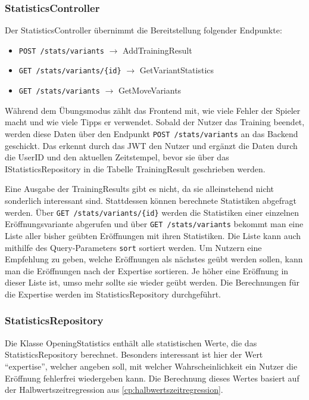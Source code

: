 \subsubsection{StatisticsController}
Der StatisticsController übernimmt die Bereitstellung folgender Endpunkte:

\begin{itemize}
  \item \lstinline|POST /stats/variants| $\rightarrow$ AddTrainingResult
  \item \lstinline|GET /stats/variants/{id}| $\rightarrow$ GetVariantStatistics
  \item \lstinline|GET /stats/variants| $\rightarrow$ GetMoveVariants
\end{itemize}

Während dem Übungsmodus zählt das Frontend mit, wie viele Fehler der Spieler macht und wie viele Tipps er verwendet. Sobald der Nutzer das Training beendet, werden diese Daten über den Endpunkt \lstinline{POST /stats/variants} an das Backend geschickt. Das erkennt durch das \ac{JWT} den Nutzer und ergänzt die Daten durch die UserID und den aktuellen Zeitstempel, bevor sie über das IStatisticsRepository in die Tabelle TrainingResult geschrieben werden.

Eine Ausgabe der TrainingResults gibt es nicht, da sie alleinstehend nicht sonderlich interessant sind. Stattdessen können berechnete Statistiken abgefragt werden. Über \lstinline|GET /stats/variants/{id}| werden die Statistiken einer einzelnen Eröffnungsvariante abgerufen und über \lstinline|GET /stats/variants| bekommt man eine Liste aller bisher geübten Eröffnungen mit ihren Statistiken. Die Liste kann auch mithilfe des Query-Parameters \lstinline{sort} sortiert werden. Um Nutzern eine Empfehlung zu geben, welche Eröffnungen als nächstes geübt werden sollen, kann man die Eröffnungen nach der Expertise sortieren. Je höher eine Eröffnung in dieser Liste ist, umso mehr sollte sie wieder geübt werden. Die Berechnungen für die Expertise werden im StatisticsRepository durchgeführt.

\subsubsection{StatisticsRepository}
Die Klasse OpeningStatistics enthält alle statistischen Werte, die das StatisticsRepository berechnet.
Besonders interessant ist hier der Wert \enquote{expertise}, welcher angeben soll, mit welcher Wahrscheinlichkeit ein Nutzer die Eröffnung fehlerfrei wiedergeben kann.
Die Berechnung dieses Wertes basiert auf der Halbwertszeitregression aus \autoref{cp:halbwertszeitregression}.

